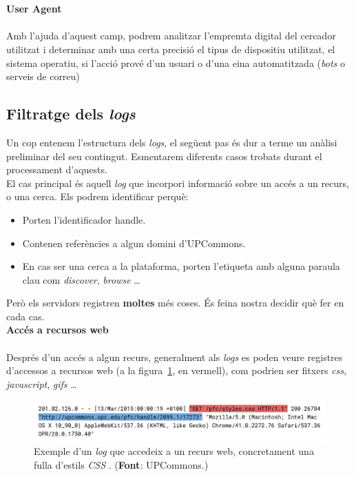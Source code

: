 \noindent \\ \\
\textbf{User Agent} \\ \\
Amb l’ajuda d’aquest camp, podrem analitzar l’empremta digital del cercador utilitzat i determinar amb una certa precisió el tipus de dispositiu utilitzat, el sistema operatiu, si l’acció prové d’un usuari o d’una eina automatitzada (\textit{bots} o serveis de correu)

\clearpage

\subsection{Filtratge dels \textit{\gls{log}s}}\label{subsec:log-filter}

Un cop entenem l'estructura dels \textit{logs}, el següent pas és dur a terme un anàlisi preliminar del seu contingut.
Esmentarem diferents casos trobats durant el processament d'aquests. \\

\noindent
El cas principal és aquell \textit{\gls{log}} que incorpori informació sobre un accés a un recurs, o una cerca.
Els podrem identificar perquè:

\begin{itemize}
    \item Porten l’identificador \gls{handle}.
    \item Contenen referències a algun domini d’\gls{UPCommons}.
    \item En cas ser una cerca a la plataforma, porten l’etiqueta amb alguna paraula clau com \textit{discover}, \textit{browse} \dots
\end{itemize}

\noindent
Però els servidors registren \textbf{moltes} més coses.
És feina nostra decidir què fer en cada cas. \\

\noindent
\textbf{Accés a recursos web} \\ \\
Després d’un accés a algun recurs, generalment als \textit{\gls{log}s} es poden veure registres d’accessos a recursos web (a la figura~\ref{fig:log-web-resource}, en vermell),
com podrien ser fitxers \textit{css}, \textit{javascript}, \textit{gifs} \dots

\begin{figure}[htbp]
    \centerline{\includegraphics[width=\textwidth]{figures/log-web-resource}}
    \captionsetup{justification=centering}
    \caption[Exemple d'un \textit{\gls{log}} que accedeix a un recurs web, concretament una fulla d'estils \textit{\gls{CSS}} .]{Exemple d'un \textit{\gls{log}} que accedeix a un recurs web, concretament una fulla d'estils \textit{\gls{CSS}} . (\textbf{Font}: \gls{UPCommons}.)}\label{fig:log-web-resource}
\end{figure}

